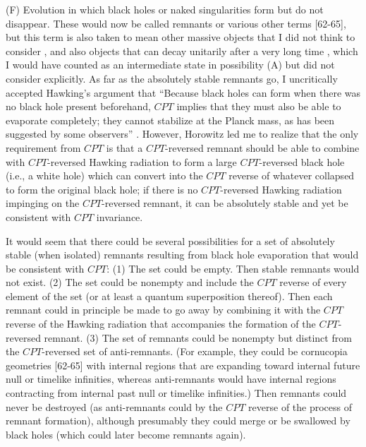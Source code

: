      (F) Evolution in which black holes or naked singularities form
but do not
disappear.  These would now be called remnants or various other terms
[62-65], but this term is also taken to mean other
massive
objects that I did not think to consider \cite{Gid92}, and also
objects that
can decay unitarily after a very long time \cite{ACN,Pre92}, which I
would
have
counted as an intermediate state in possibility (A) but did not
consider
explicitly.  As far as the absolutely stable remnants go, I
uncritically
accepted Hawking's argument that ``Because black holes can form when
there was
no black hole present beforehand, $CPT$ implies that they must also
be able to
evaporate completely; they cannot stabilize at the Planck mass, as
has been
suggested by some observers'' \cite{Haw76,HawHay}.  However,
Horowitz \cite{Hor93pri}
led me to realize that the only requirement from $CPT$ is that a
$CPT$-reversed
remnant should be able to combine with $CPT$-reversed Hawking
radiation to form
a large $CPT$-reversed black hole (i.e., a white hole) which can
convert into
the $CPT$ reverse of whatever collapsed to form the original black
hole; if
there is no $CPT$-reversed Hawking radiation impinging on the
$CPT$-reversed
remnant, it can be absolutely stable and yet be consistent with $CPT$
invariance.

     It would seem that there could be several possibilities for a
set of
absolutely
stable (when isolated) remnants resulting from black hole evaporation
that
would be consistent with $CPT$:  (1) The set could be empty.  Then
stable
remnants would not exist.  (2) The set could be nonempty and include
the
$CPT$ reverse of every element of the set (or at least a quantum
superposition
thereof).  Then each remnant could in principle be made to go away by
combining it with the $CPT$ reverse of the Hawking radiation that
accompanies the formation of the $CPT$-reversed remnant.  (3) The set
of remnants could be nonempty but distinct from the $CPT$-reversed
set of anti-remnants.  (For example, they could be cornucopia
geometries
[62-65]
with internal regions that are expanding toward internal future null
or
timelike
infinities, whereas anti-remnants would have internal regions
contracting from
internal past null or timelike infinities.) Then remnants could never
be
destroyed
(as anti-remnants could by the $CPT$ reverse of the process
of remnant formation), although presumably they could merge
or be swallowed by black holes (which could later become
remnants again).

